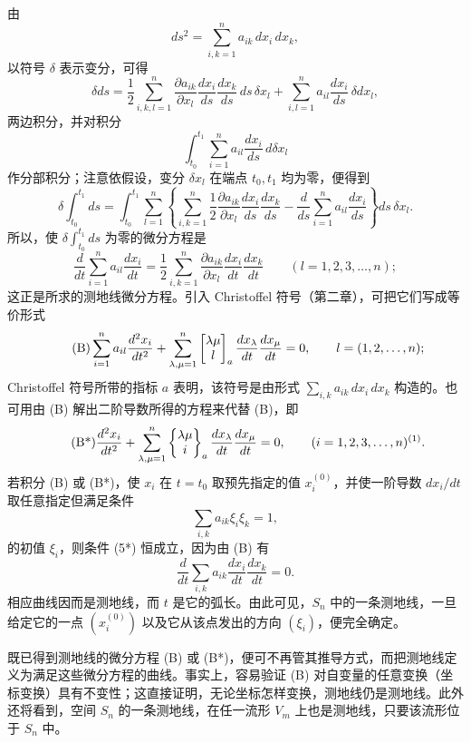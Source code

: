 由
\[
 ds^2=\sum_{i,k=1}^{n}a_{ik}\,dx_i\,dx_k,
\]
以符号 \(\delta\) 表示变分，可得
\[
 \delta ds=\frac12\sum_{i,k,l=1}^{n}\frac{\partial a_{ik}}{\partial x_l}
       \frac{dx_i}{ds}\frac{dx_k}{ds}\,ds\,\delta x_l
       +\sum_{i,l=1}^{n}a_{il}\frac{dx_i}{ds}\,\delta dx_l,
\]
两边积分，并对积分
\[
 \int_{t_0}^{t_1}\sum_{i=1}^{n}a_{il}\frac{dx_i}{ds}\,d\delta x_l
\]
作分部积分；注意依假设，变分 \(\delta x_l\) 在端点 \(t_0,t_1\) 均为零，便得到
\[
 \delta\int_{t_0}^{t_1}ds=\int_{t_0}^{t_1}\sum_{l=1}^{n}\left\{
 \sum_{i,k=1}^{n}\frac12\frac{\partial a_{ik}}{\partial x_l}
       \frac{dx_i}{ds}\frac{dx_k}{ds}
 -\frac{d}{ds}\sum_{i=1}^{n}a_{il}\frac{dx_i}{ds}\right\}ds\,\delta x_l.
\]
所以，使 \(\delta\int_{t_0}^{t_1}ds\) 为零的微分方程是
\begin{equation}\tag{A}
 \frac{d}{dt}\sum_{i=1}^{n}a_{il}\frac{dx_i}{dt}
 =\frac12\sum_{i,k=1}^{n}\frac{\partial a_{ik}}{\partial x_l}\frac{dx_i}{dt}\frac{dx_k}{dt}
 \qquad(l=1,2,3,\ldots,n);
\end{equation}
这正是所求的测地线微分方程。引入 Christoffel 符号（第二章），可把它们写成等价形式
\begin{equation}\tag{B}
 \sum_{i=1}^{n}a_{il}\frac{d^2x_i}{dt^2}
 +\sum_{\lambda,\mu=1}^{n}\left[\begin{matrix}\lambda\mu\\l\end{matrix}\right]_{a}\frac{dx_\lambda}{dt}\frac{dx_\mu}{dt}=0,
 \qquad l=(1,2,\ldots,n);
\end{equation}
Christoffel 符号所带的指标 \(a\) 表明，该符号是由形式 \(\sum_{i,k}a_{ik}\,dx_i\,dx_k\) 构造的。也可用由 (B) 解出二阶导数所得的方程来代替 (B)，即
\begin{equation}\tag{B*}
 \frac{d^2x_i}{dt^2}+\sum_{\lambda,\mu=1}^{n}\chrB{\lambda\mu}{i}_{a}\frac{dx_\lambda}{dt}\frac{dx_\mu}{dt}=0,
 \qquad (i=1,2,3,
\ldots,n)\srcfnmark{1}.
\end{equation}
若积分 (B) 或 (B*)，使 \(x_i\) 在 \(t=t_0\) 取预先指定的值 \(x_i^{(0)}\)，并使一阶导数 \(dx_i/dt\) 取任意指定但满足条件
\[
 \sum_{i,k}a_{ik}\xi_i\xi_k=1,
\]
的初值 \(\xi_i\)，则条件 (5*) 恒成立，因为由 (B) 有
\[
 \frac{d}{dt}\sum_{i,k}a_{ik}\frac{dx_i}{dt}\frac{dx_k}{dt}=0.
\]
相应曲线因而是测地线，而 \(t\) 是它的弧长。由此可见，\(S_n\) 中的一条测地线，一旦给定它的一点 \((x_i^{(0)})\) 以及它从该点发出的方向 \((\xi_i)\)，便完全确定。

既已得到测地线的微分方程 (B) 或 (B*)，便可不再管其推导方式，而把测地线定义为满足这些微分方程的曲线。事实上，容易验证 (B) 对自变量的任意变换（坐标变换）具有不变性；这直接证明，无论坐标怎样变换，测地线仍是测地线。此外还将看到，空间 \(S_n\) 的一条测地线，在任一流形 \(V_m\) 上也是测地线，只要该流形位于 \(S_n\) 中。

